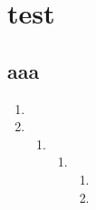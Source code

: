 \documentclass{ctexart}
\begin{document}
\chapter{test}
\section{aaa}
\begin{enumerate}
	\item
	\item
	      \begin{enumerate}
		      \item
		            \begin{enumerate}
			            \item
			                  \begin{enumerate}
				                  \item
				                  \item
			                  \end{enumerate}
		            \end{enumerate}
	      \end{enumerate}
\end{enumerate}
\end{document}
